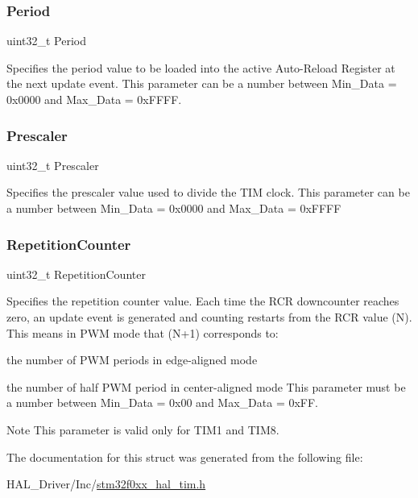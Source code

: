 \subsubsection{\texorpdfstring{Period}{Period}}
{\footnotesize\ttfamily uint32\+\_\+t Period}

Specifies the period value to be loaded into the active Auto-\/\+Reload Register at the next update event. This parameter can be a number between Min\+\_\+\+Data = 0x0000 and Max\+\_\+\+Data = 0x\+F\+F\+FF. \mbox{\label{struct_t_i_m___base___init_type_def_affb82025da5b8d4a06e61f1690460f4d}} 
\subsubsection{\texorpdfstring{Prescaler}{Prescaler}}
{\footnotesize\ttfamily uint32\+\_\+t Prescaler}

Specifies the prescaler value used to divide the T\+IM clock. This parameter can be a number between Min\+\_\+\+Data = 0x0000 and Max\+\_\+\+Data = 0x\+F\+F\+FF \mbox{\label{struct_t_i_m___base___init_type_def_a3c2ea8434bbce30aa191a816e27f9c1f}} 
\subsubsection{\texorpdfstring{Repetition\+Counter}{RepetitionCounter}}
{\footnotesize\ttfamily uint32\+\_\+t Repetition\+Counter}

Specifies the repetition counter value. Each time the R\+CR downcounter reaches zero, an update event is generated and counting restarts from the R\+CR value (N). This means in P\+WM mode that (N+1) corresponds to\+:
\begin{DoxyItemize}
\item the number of P\+WM periods in edge-\/aligned mode
\item the number of half P\+WM period in center-\/aligned mode This parameter must be a number between Min\+\_\+\+Data = 0x00 and Max\+\_\+\+Data = 0x\+FF. \begin{DoxyNote}{Note}
This parameter is valid only for T\+I\+M1 and T\+I\+M8. 
\end{DoxyNote}

\end{DoxyItemize}

The documentation for this struct was generated from the following file\+:\begin{DoxyCompactItemize}
\item 
H\+A\+L\+\_\+\+Driver/\+Inc/\hyperlink{stm32f0xx__hal__tim_8h}{stm32f0xx\+\_\+hal\+\_\+tim.\+h}\end{DoxyCompactItemize}
